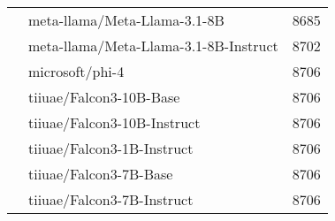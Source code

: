 \begin{table}[]
\begin{tabular}{llr}
 & meta-llama/Meta-Llama-3.1-8B & 8685 \\
 & meta-llama/Meta-Llama-3.1-8B-Instruct & 8702 \\
 & microsoft/phi-4 & 8706 \\
 & tiiuae/Falcon3-10B-Base & 8706 \\
 & tiiuae/Falcon3-10B-Instruct & 8706 \\
 & tiiuae/Falcon3-1B-Instruct & 8706 \\
 & tiiuae/Falcon3-7B-Base & 8706 \\
 & tiiuae/Falcon3-7B-Instruct & 8706 \\
\bottomrule
\end{tabular}

    \label{tab:Qwen2.5-72B-Instruct}
\end{table}

